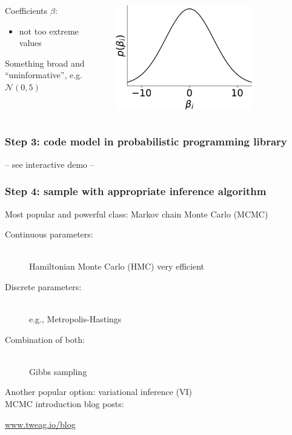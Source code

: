 \documentclass[t,aspectratio=169]{beamer}
\begin{document}
\begin{frame}
\begin{columns}
\begin{column}[T]{0.3\textwidth}
    \end{column}
  \end{columns}
  \begin{columns}
    \begin{column}{0.65\textwidth}
      Coefficients $\beta$:\\
      \begin{itemize}
      \item not too extreme values \shrug
      \end{itemize}
      Something broad and ``uninformative'', e.g. $\mathcal{N}(0, 5)$
    \end{column}
    \begin{column}[T]{0.3\textwidth}
      \includegraphics[width=0.7\textwidth]{images/widenormal-crop}
    \end{column}
  \end{columns}
\end{frame}

\begin{frame}
  \frametitle{Step 3: code model in probabilistic programming library}
  \centering
  \vfill
  \Huge-- see interactive demo --
  \vfill
\end{frame}

\begin{frame}
  \frametitle{Step 4: sample with appropriate inference algorithm}
  Most popular and powerful class: Markov chain Monte Carlo (MCMC)
  \begin{description}
  \item[Continuous parameters:] \hfill \\
    Hamiltonian Monte Carlo (HMC) very efficient
  \item[Discrete parameters:] \hfill \\
    e.g., Metropolis-Hastings
  \item[Combination of both:]  \hfill \\
    Gibbs sampling
  \end{description}
  Another popular option: variational inference (VI)\\
  \bigskip
  MCMC introduction blog posts:
  \begin{center}
    \url{www.tweag.io/blog}
  \end{center}
\end{frame}
\end{document}

